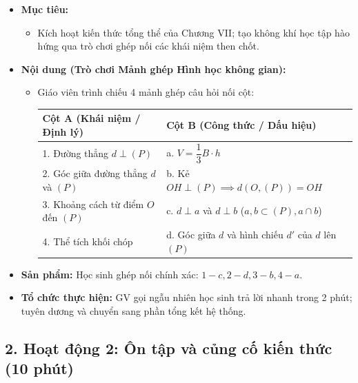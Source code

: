 \documentclass[12pt, a4paper]{article}
\begin{document}
\begin{itemize}[leftmargin=1.2cm]
    \item[a)] \textbf{Mục tiêu:}
    \begin{itemize}[leftmargin=0.6cm]
        \item Kích hoạt kiến thức tổng thể của Chương VII; tạo không khí học tập hào hứng qua trò chơi ghép nối các khái niệm then chốt.
    \end{itemize}

    \item[b)] \textbf{Nội dung (Trò chơi Mảnh ghép Hình học không gian):}
    \begin{itemize}[leftmargin=0.6cm]
        \item Giáo viên trình chiếu 4 mảnh ghép câu hỏi nối cột:
        \begin{center}
        \begin{tabular}{|l|l|}
        \hline
        \textbf{Cột A (Khái niệm / Định lý)} & \textbf{Cột B (Công thức / Dấu hiệu)} \\ \hline
        1. Đường thẳng $d \perp (P)$ & a. $V = \dfrac{1}{3} B \cdot h$ \\ \hline
        2. Góc giữa đường thẳng $d$ và $(P)$ & b. Kẻ $OH \perp (P) \implies d(O, (P)) = OH$ \\ \hline
        3. Khoảng cách từ điểm $O$ đến $(P)$ & c. $d \perp a$ và $d \perp b$ ($a, b \subset (P), a \cap b$) \\ \hline
        4. Thể tích khối chóp & d. Góc giữa $d$ và hình chiếu $d'$ của $d$ lên $(P)$ \\ \hline
        \end{tabular}
        \end{center}
    \end{itemize}

    \item[c)] \textbf{Sản phẩm:} Học sinh ghép nối chính xác: $1 - c, 2 - d, 3 - b, 4 - a$.
    \item[d)] \textbf{Tổ chức thực hiện:} GV gọi ngẫu nhiên học sinh trả lời nhanh trong 2 phút; tuyên dương và chuyển sang phần tổng kết hệ thống.
\end{itemize}

\subsection*{2. Hoạt động 2: Ôn tập và củng cố kiến thức (10 phút)}
\end{document}
